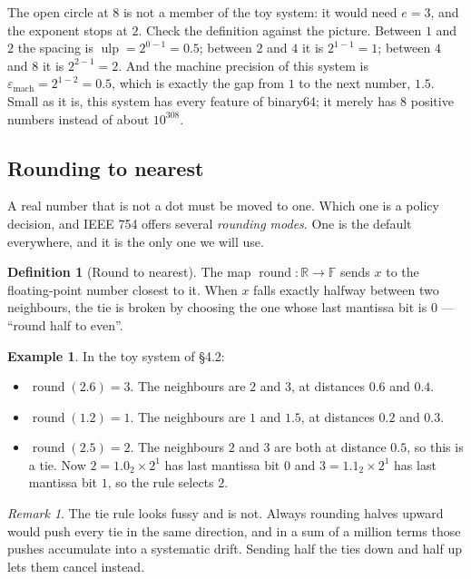 \documentclass[11pt]{article}
\theoremstyle{plain}
\theoremstyle{definition}
\newtheorem{defn}{Definition}[section]
\newtheorem{ex}{Example}[section]
\theoremstyle{remark}
\newtheorem*{rmk}{Remark}
\newcommand{\R}{\mathbb{R}}
\newcommand{\F}{\mathbb{F}}
\newcommand{\epsm}{\varepsilon_{\mathrm{mach}}}
\begin{document}
\noindent The open circle at $8$ is not a member of the toy system: it would
need $e=3$, and the exponent stops at $2$. Check the definition against the
picture. Between $1$ and $2$ the
spacing is $\operatorname{ulp}=2^{0-1}=0.5$; between $2$ and $4$ it is
$2^{1-1}=1$; between $4$ and $8$ it is $2^{2-1}=2$. And the machine precision of
this system is $\epsm=2^{1-2}=0.5$, which is exactly the gap
from $1$ to the next number, $1.5$. Small as it is, this system has every
feature of binary64; it merely has $8$ positive numbers instead of about
$10^{308}$.

\subsection{Rounding to nearest}
A real number that is not a dot must be moved to one. Which one is a policy
decision, and IEEE 754 offers several \emph{rounding modes}. One is the default
everywhere, and it is the only one we will use.

\begin{defn}[Round to nearest]
The map $\operatorname{round}:\R\to\F$ sends $x$ to the floating-point number
closest to it. When $x$ falls exactly halfway between two neighbours, the tie is
broken by choosing the one whose last mantissa bit is $0$ --- ``round half to
even''.
\end{defn}

\begin{ex}
In the toy system of \S4.2:
\begin{itemize}[leftmargin=1.4em,itemsep=3pt,topsep=3pt]
  \item $\operatorname{round}(2.6)=3$. The neighbours are $2$ and $3$, at
        distances $0.6$ and $0.4$.
  \item $\operatorname{round}(1.2)=1$. The neighbours are $1$ and $1.5$, at
        distances $0.2$ and $0.3$.
  \item $\operatorname{round}(2.5)=2$. The neighbours $2$ and $3$ are both at
        distance $0.5$, so this is a tie. Now $2=1.0_{2}\times2^{1}$ has last
        mantissa bit $0$ and $3=1.1_{2}\times2^{1}$ has last mantissa bit $1$,
        so the rule selects $2$.
\end{itemize}
\end{ex}

\begin{rmk}
The tie rule looks fussy and is not. Always rounding halves upward would push
every tie in the same direction, and in a sum of a million terms those pushes
accumulate into a systematic drift. Sending half the ties down and half up lets
them cancel instead.
\end{rmk}
\end{document}
